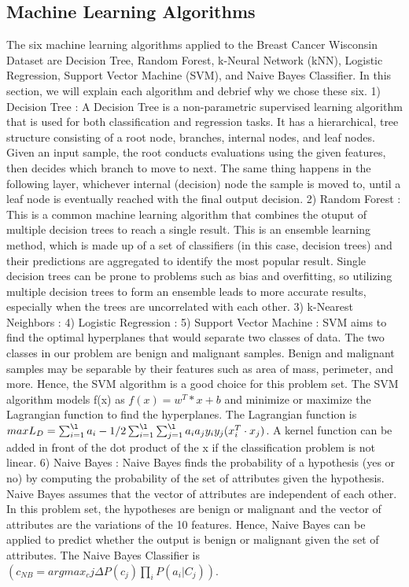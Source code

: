 \documentclass[conference]{IEEEtran}
\begin{document}
\subsection{Machine Learning Algorithms}
The six machine learning algorithms applied to the Breast Cancer Wisconsin Dataset are Decision Tree, Random Forest, k-Neural Network (kNN), Logistic Regression, Support Vector Machine (SVM), and Naive Bayes Classifier. In this section, we will explain each algorithm and debrief why we chose these six. 
1) Decision Tree : A Decision Tree is a non-parametric supervised learning algorithm that is used for both classification and regression tasks. It has a hierarchical, tree structure consisting of a root node, branches, internal nodes, and leaf nodes. Given an input sample, the root conducts evaluations using the given features, then decides which branch to move to next. The same thing happens in the following layer, whichever internal (decision) node the sample is moved to, until a leaf node is eventually reached with the final output decision. 
2) Random Forest : This is a common machine learning algorithm that combines the otuput of multiple decision trees to reach a single result. This is an ensemble learning method, which is made up of a set of classifiers (in this case, decision trees) and their predictions are aggregated to identify the most popular result. Single decision trees can be prone to problems such as bias and overfitting, so utilizing multiple decision trees to form an ensemble leads to more accurate results, especially when the trees are uncorrelated with each other.
3) k-Nearest Neighbors :
4) Logistic Regression :
5) Support Vector Machine : SVM aims to find the optimal hyperplanes that would separate two classes of data. The two classes in our problem are benign and malignant samples. Benign and malignant samples may be separable by their features such as area of mass, perimeter, and more. Hence, the SVM algorithm is a good choice for this problem set. The SVM algorithm models f(x) as \(f(x) = w^T*x + b\) and minimize or maximize the Lagrangian function to find the hyperplanes. The Lagrangian function is \(max L_D = \sum_{i=1}^{\l}a_i - 1/2\sum_{i=1}^{\l}\sum_{j=1}^{\l}a_i a_j y_i y_j(x_i^T \cdot x_j)\). A kernel function can be added in front of the dot product of the x if the classification problem is not linear. 
6) Naive Bayes : Naive Bayes finds the probability of a hypothesis (yes or no) by computing the probability of the set of attributes given the hypothesis. Naive Bayes assumes that the vector of attributes are independent of each other. In this problem set, the hypotheses are benign or malignant and the vector of attributes are the variations of the 10 features. Hence, Naive Bayes can be applied to predict whether the output is benign or malignant given the set of attributes. The Naive Bayes Classifier is $(c_{NB} = argmax_cj\Delta P(c_j) \prod_i P(a_i |C_j))$. 
\end{document}
